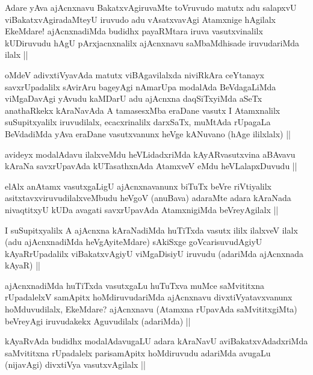
\begin{artha}
Adare yAva ajAcnxnavu BakatxvAgiruvaMte toVruvudo matutx adu salapxvU viBakatxvAgiradaMteyU iruvudo adu vAsatxvavAgi Atamxnige hAgilalx EkeMdare! ajAcnxnadiMda budidhx payaRMtara iruva vasutxvinalilx kUDiruvudu hAgU pArxjacnxnalilx ajAcnxnavu saMbaMdhisade iruvudariMda ilalx ||
\end{artha}


\begin{artha}
oMdeV adivxtiVyavAda matutx viBAgavilalxda niviRkAra ceYtanayx savxrUpadalilx sAvirAru bageyAgi nAmarUpa modalAda BeVdagaLiMda viMgaDavAgi yAvudu kaMDarU adu ajAcnxna daqSiTxyiMda aSeTx anathaRkekx kAraNavAda A tamasesxMba eraDane vasutx I Atamxnalilx suSupitxyalilx iruvudilalx, ecacxrinalilx darxSaTx, muMtAda rUpagaLa BeVdadiMda yAva eraDane vasutxvanunx heVge kANuvano (hAge ililxlalx) ||
\end{artha}


\begin{artha}
avideyx modalAdavu ilalxveMdu heVLidadxriMda kAyARvasutxvina aBAvavu kAraNa savxrUpavAda kUTasathxnAda AtamxveV eMdu heVLalapxDuvudu ||
\end{artha}


\begin{artha}
elAlx anAtamx vasutxgaLigU ajAcnxnavanunx biTuTx beVre riVtiyalilx asitxtavxviruvudilalxveMbudu heVgoV (anuBava) adaraMte adara kAraNada nivaqtitxyU kUDa avagati savxrUpavAda AtamxnigiMda beVreyAgilalx ||
\end{artha}

\begin{artha}
I suSupitxyalilx A ajAcnxna kAraNadiMda huTiTxda vasutx ililx ilalxveV ilalx (adu ajAcnxnadiMda heVgAyiteMdare) sAkiSxge goVcarisuvudAgiyU kAyaRrUpadalilx viBakatxvAgiyU viMgaDisiyU iruvudu (adariMda ajAcnxnada kAyaR) ||
\end{artha}

\begin{artha}
ajAcnxnadiMda huTiTxda vasutxgaLu huTuTxva muMce saMvititxna rUpadalelxV samApitx hoMdiruvudariMda ajAcnxnavu divxtiVyatavxvanunx hoMduvudilalx, EkeMdare? ajAcnxnavu (Atamxna rUpavAda saMvititxgiMta) beVreyAgi iruvudakekx Aguvudilalx (adariMda) ||
\end{artha}

\begin{artha}
kAyaRvAda budidhx modalAdavugaLU adara kAraNavU aviBakatxvAdadxriMda saMvititxna rUpadalelx parisamApitx hoMdiruvudu adariMda avugaLu (nijavAgi) divxtiVya vasutxvAgilalx ||
\end{artha}

